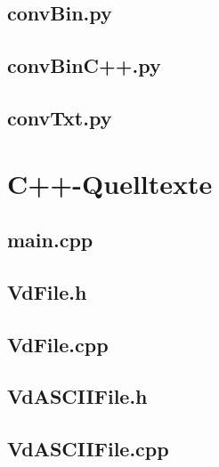 \documentclass[a4paper,12pt,bibliography=totoc, listof=totoc,titlepage,pointlessnumbers]{scrreprt}
\begin{document}
\begin{appendices}
\section{convBin.py}
\label{a:convBin.py}


\section{convBinC++.py}
\label{a:convBinCpp.py}


\section{convTxt.py}
\label{a:convTxt.py}


\chapter{C++-Quelltexte}
\label{a:cpp}

\section{main.cpp}
\label{a:main.cpp}


\section{VdFile.h}
\label{a:VdFile.h}


\section{VdFile.cpp}
\label{a:VdFile.cpp}


\section{VdASCIIFile.h}
\label{a:VdASCIIFile.h}


\section{VdASCIIFile.cpp}
\label{a:VdASCIIFile.cpp}



\end{appendices}
\end{document}
